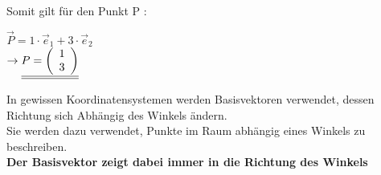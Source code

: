 Somit gilt für den Punkt P : \\
\begin{center}
	$\vec{P} = 1\cdot \vec{e}_1 + 3 \cdot \vec{e}_2$ \\
	$\rightarrow \underline{\underline{ P = \left ( \begin{array}{c} 1 \\ 3 \end{array}\right)}}$
\end{center}
\iend

\newpage


\beginip
In gewissen Koordinatensystemen werden Basisvektoren verwendet, dessen Richtung sich Abhängig  des Winkels ändern. \\
Sie werden dazu verwendet, Punkte im Raum abhängig eines Winkels zu beschreiben. \\
\textbf{Der Basisvektor zeigt dabei immer in die Richtung des Winkels}
\iend

